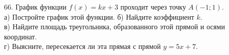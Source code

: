 66. График функции $f(x)=kx+3$ проходит через точку $A(-1;1).$\\
а) Постройте график этой функции. б) Найдите коэффициент $k.$\\
в) Найдите площадь треугольника, образованного этой прямой и осями координат.\\
г) Выясните, пересекается ли эта прямая с прямой $y=5x+7.$\\
